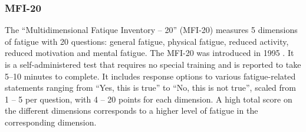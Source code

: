 \subsubsection{\acl{MFI-20}}
The ``Multidimensional Fatique Inventory – 20'' (\acs{MFI-20}) measures 5 dimensions of fatigue with 20 questions: general fatigue, physical fatigue, reduced activity, reduced motivation and mental fatigue. The \acs{MFI-20} was introduced in 1995 \cite{smets1995mfi20}. It is a self-administered test that requires no special training and is reported to take 5--10 minutes to complete. It includes response options to various fatigue-related statements ranging from ``Yes, this is true'' to ``No, this is not true'', scaled from 1 -- 5 per question, with 4 -- 20 points for each dimension. A high total score on the different dimensions corresponds to a higher level of fatigue in the corresponding dimension.

